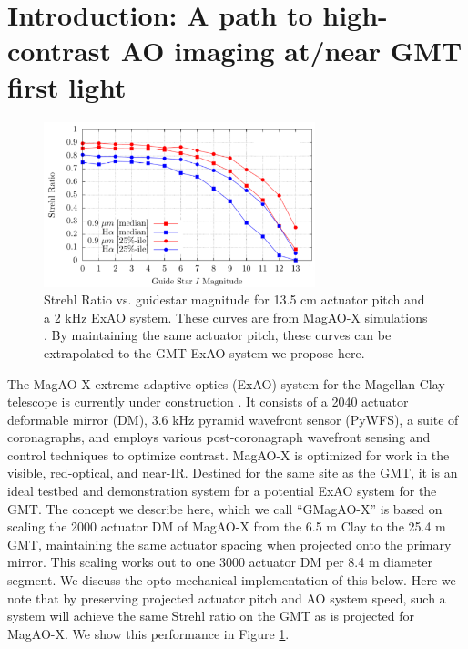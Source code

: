 \documentclass[12pt,preprint]{aastex}
\begin{document}
\section{Introduction: A path to high-contrast AO imaging at/near GMT first light} \label{sec:intro}

\begin{figure}
\centering
\vspace{-0.4in}
\includegraphics[width=3.1in]{figures/fig1.png}
\vspace{-0.2in}
\caption{ Strehl Ratio vs. guidestar magnitude for 13.5 cm actuator pitch and a 2 kHz ExAO system.  These curves are from MagAO-X simulations \citep{2018SPIE10703E..09M}.  By maintaining the same actuator pitch, these curves can be extrapolated to the GMT ExAO system we propose here. \label{fig:strehl} }
\end{figure}

The MagAO-X extreme adaptive optics (ExAO) system for the Magellan Clay telescope is currently under construction \citep{2018SPIE10703E..09M, 2018SPIE10703E..4YC}.  It consists of a 2040 actuator deformable mirror (DM), 3.6 kHz pyramid wavefront sensor (PyWFS), a suite of coronagraphs, and employs various post-coronagraph wavefront sensing and control techniques to optimize contrast.  MagAO-X is optimized for work in the visible, red-optical, and near-IR.  Destined for the same site as the GMT, it is an ideal testbed and demonstration system for a potential ExAO system for the GMT.
The concept we describe here, which we call “GMagAO-X” is based on scaling the 2000 actuator DM of MagAO-X from the 6.5 m Clay to the 25.4 m GMT, maintaining the same actuator spacing when projected onto the primary mirror.  This scaling works out to one 3000 actuator DM per 8.4 m diameter segment.  We discuss the opto-mechanical implementation of this below.  Here we note that by preserving projected actuator pitch and AO system speed, such a system will achieve the same Strehl ratio on the GMT as is projected for MagAO-X.  We show this performance in Figure \ref{fig:strehl}.
\end{document}
